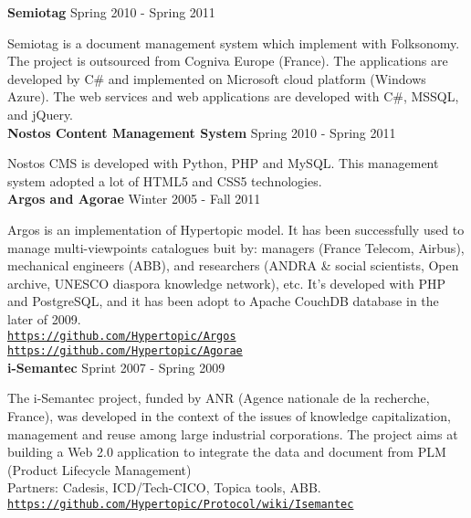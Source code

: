 \documentclass[10pt]{article}
\newcommand{\halfblankline}{\quad\vspace{-0.5\baselineskip}\pagebreak[3]}
\providecommand*\url[1]{\href{#1}{#1}}
\renewcommand*\url[1]{\href{#1}{\texttt{#1}}}
\begin{document}
\textbf{Semiotag}
\hfill Spring 2010 - Spring 2011

\halfblankline

Semiotag is a document management system which implement  with Folksonomy. The project is outsourced from Cogniva Europe (France). The applications are developed by C\# and implemented on Microsoft cloud platform (Windows Azure). The web services and web applications are developed with C\#, MSSQL, and jQuery.\\


\textbf{Nostos Content Management System}
\hfill Spring 2010 - Spring 2011

\halfblankline

Nostos CMS is developed with Python, PHP and MySQL. This management system adopted a lot of HTML5 and CSS5 technologies. \\


\textbf{Argos and Agorae}
\hfill Winter 2005 - Fall 2011

\halfblankline

Argos is an  implementation of Hypertopic model. It has been successfully used to manage multi-viewpoints catalogues buit by: managers (France Telecom, Airbus), mechanical engineers (ABB), and researchers (ANDRA \& social scientists, Open archive, UNESCO diaspora knowledge network), etc.
It's developed with PHP and PostgreSQL, and it has been adopt to Apache CouchDB database in the later of 2009. \\
\url{https://github.com/Hypertopic/Argos} \\
\url{https://github.com/Hypertopic/Agorae} \\


\textbf{i-Semantec}
\hfill Sprint 2007 - Spring 2009

\halfblankline

The i-Semantec project, funded by ANR (Agence nationale de la recherche, France), was developed in the context of the issues of knowledge capitalization, management and reuse among large industrial corporations.  The project aims at building a Web 2.0 application to integrate the data and document from PLM (Product Lifecycle Management) \\
Partners: Cadesis, ICD/Tech-CICO, Topica tools, ABB.\\
\url{https://github.com/Hypertopic/Protocol/wiki/Isemantec} \\\



\halfblankline
\end{document}
